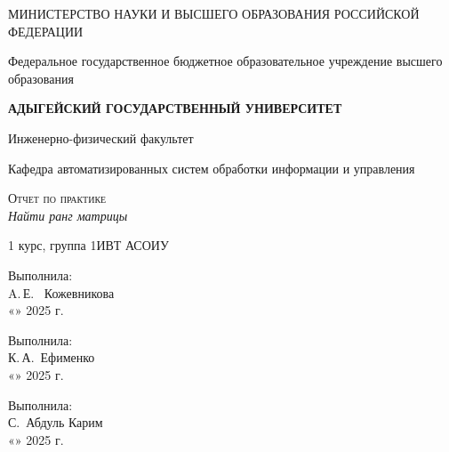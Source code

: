 \documentclass[a4paper,12pt]{article}
\begin{document}
\thispagestyle{empty}
	\begin{titlepage}
		\begin{center}
			\large
			МИНИСТЕРСТВО НАУКИ И ВЫСШЕГО ОБРАЗОВАНИЯ РОССИЙСКОЙ ФЕДЕРАЦИИ
			
			Федеральное государственное бюджетное образовательное учреждение высшего образования
			
			\textbf{АДЫГЕЙСКИЙ ГОСУДАРСТВЕННЫЙ УНИВЕРСИТЕТ}
			\vspace{0.25cm}
			
			Инженерно-физический факультет
			
			Кафедра автоматизированных систем обработки информации и управления
			\vfill

			\vfill
			
			\textsc{Отчет по практике}\\[5mm]
			
			{\textit{Найти ранг матрицы}}
			\bigskip
			
			1 курс, группа 1ИВТ АСОИУ
		\end{center}
		\vfill
		
		\newlength{\ML}
		\hfill\begin{minipage}{0.5\textwidth}
			Выполнила:\\
			\underline{\hspace{\ML}} A.\,Е.~ Кожевникова\\
			«\underline{\hspace{0.7cm}}» \underline{\hspace{2cm}} 2025 г.
		\end{minipage}%
		\bigskip

		\hfill\begin{minipage}{0.5\textwidth}
			Выполнила:\\
			\underline{\hspace{\ML}} К.\,А.~Ефименко\\
			«\underline{\hspace{0.7cm}}» \underline{\hspace{2cm}} 2025 г.
		\end{minipage}%
		\bigskip

		\hfill\begin{minipage}{0.5\textwidth}
			Выполнила:\\
			\underline{\hspace{\ML}} С.~Абдуль Карим\\
			«\underline{\hspace{0.7cm}}» \underline{\hspace{2cm}} 2025 г.
		\end{minipage}%
		\bigskip
		

\end{titlepage}
\end{document}
